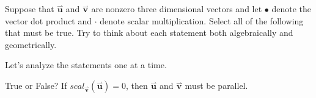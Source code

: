 \documentclass{ximera}
\author{Jim Talamo}
\begin{document}
\begin{exercise}
Suppose that $\overset{\boldsymbol{\rightharpoonup}}{\mathbf{u}}$ and $\overset{\boldsymbol{\rightharpoonup}}{\mathbf{v}}$ are nonzero three dimensional vectors and let $\bullet$ denote the vector dot product and $\cdot$ denote scalar multiplication.  Select all of the following that must be true.  Try to think about each statement both algebraically and geometrically.

\begin{selectAll}

\begin{hint}
Let's analyze the statements one at a time.
\begin{problem}
True or False? If $scal_\overset{\boldsymbol{\rightharpoonup}}{\mathbf{v}}(\overset{\boldsymbol{\rightharpoonup}}{\mathbf{u}}) =0$, then $\overset{\boldsymbol{\rightharpoonup}}{\mathbf{u}}$ and $\overset{\boldsymbol{\rightharpoonup}}{\mathbf{v}}$ must be parallel.


\end{problem}
\end{hint}
\end{selectAll}
\end{exercise}
\end{document}
